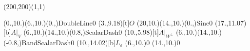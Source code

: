 \unitlength=1bp%

\begin{feynartspicture}(200,200)(1,1)

\FADiagram{}
\FAProp(0.,10.)(6.,10.)(0.,){DoubleLine}{0}
\FALabel(3.,9.18)[t]{$O$}
\FAProp(20,10.)(14.,10.)(0.,){Sine}{0}
\FALabel(17.,11.07)[b]{$A|_V$}
\FAProp(6.,10.)(14.,10.)(0.8,){ScalarDash}{0}
\FALabel(10.,5.98)[t]{$A|_{W^\perp}$}
\FAProp(6.,10.)(14.,10.)(-0.8,){BandScalarDash}{0}
\FALabel(10.,14.02)[b]{$L_\varepsilon$}
\FAVert(6.,10.){0}
\FAVert(14.,10.){0}
\end{feynartspicture}

